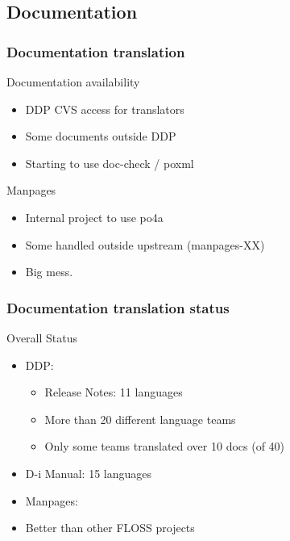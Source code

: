 \documentclass{beamer}
\begin{document}
\subsection{Documentation}

\begin{frame}
  \frametitle{Documentation translation}
	\begin{block}
		{Documentation availability}
		\begin{itemize}
		\item DDP CVS access for translators
		\item Some documents outside DDP
		\item Starting to use doc-check / poxml
		\end{itemize}
	\end{block}
	\begin{block}
		{Manpages}
		\begin{itemize}
		\item Internal project to use po4a
		\item Some handled outside upstream (manpages-XX)
		\item Big mess.
		\end{itemize}
	\end{block}
\end{frame}

\begin{frame}
  \frametitle{Documentation translation status}
	\begin{block}
		{Overall Status}
		\begin{itemize}
		\item DDP:
		\begin{itemize}
		\item Release Notes: 11 languages
		\item More than 20 different language teams
		\item Only some teams translated over 10 docs (of 40)
		\end{itemize}
		\item D-i Manual: 15 languages
		\item Manpages: 
		\item Better than other FLOSS projects
		\end{itemize}
	\end{block}
\end{frame}
\end{document}
